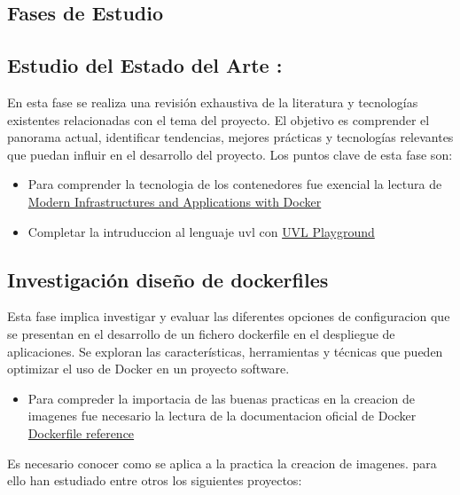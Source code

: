 \documentclass[12pt, a4paper, twoside]{article}
\begin{document}
\subsection{Fases de Estudio}

\subsection{Estudio del Estado del Arte :}
En esta fase se realiza una revisión exhaustiva de la literatura y tecnologías existentes relacionadas con el tema del 
proyecto. El objetivo es comprender el panorama actual, identificar tendencias, mejores prácticas y tecnologías 
relevantes que puedan influir en el desarrollo del proyecto. Los puntos clave de esta fase son:

\begin{itemize}
	\item Para comprender la tecnologia de los contenedores fue exencial la lectura de \href{https://www.oreilly.com/library/view/docker-certified-associate/9781839211898/c5ecd7bc-b7ed-4303-89a8-e487c6a220ed.xhtml#uuid-1a5da664-fb76-4e56-bdb0-83255dde9e78}{Modern Infrastructures and Applications with Docker} \cite{docker_certified_associate}
	\item Completar la intruduccion al lenguaje uvl con \href{https://uvl.uni-ulm.de/}{UVL Playground} \cite{uvl_playground}
\end{itemize}

\subsection{Investigación diseño de dockerfiles}
Esta fase implica investigar y evaluar las diferentes opciones de configuracion que se presentan en el desarrollo de un fichero dockerfile en el 
despliegue de aplicaciones. Se exploran las características, herramientas y técnicas que pueden optimizar el uso de 
Docker en un proyecto software. 

\begin{itemize}
	\item Para compreder la importacia de las buenas practicas en la creacion de imagenes fue necesario la lectura de la documentacion oficial de Docker \href{https://docs.docker.com/reference/dockerfile/}{Dockerfile reference} \cite{dockerfile_reference}
\end{itemize}

Es necesario conocer como se aplica a la practica la creacion de imagenes. para ello han estudiado entre otros los siguientes proyectos:
\end{document}

